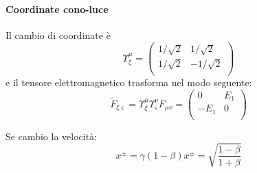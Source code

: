 \paragraph{Coordinate cono-luce}
Il cambio di coordinate \`e
\[ \Upsilon_\xi^\mu = 
\begin{pmatrix}
	1/\sqrt{2} & 1/\sqrt{2}  \\
	1/\sqrt{2} & -1/\sqrt{2} \\
\end{pmatrix} 
\]
e il tensore elettromagnetico trasforma nel modo seguente:
\[ \tilde{F}_{\xi\varsigma} = \Upsilon_\xi^\mu \Upsilon_\varsigma^\nu F_{\mu\nu} = 
\begin{pmatrix}
	0    & E_1 \\
	-E_1 & 0   \\
\end{pmatrix}
\]

Se cambio la velocit\`a:
\[ x^{\pm} = \gamma(1-\beta) x^{\pm} = \sqrt{\frac{1-\beta}{1+\beta}} \]








































